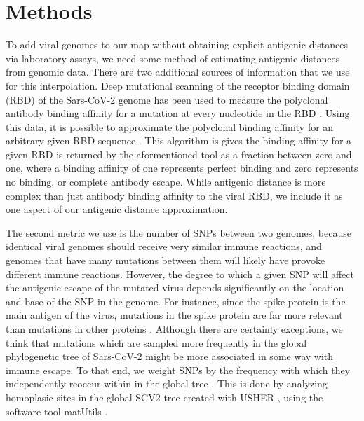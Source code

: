 \documentclass{article}
\begin{document}

\section{Methods}

To add viral genomes to our map without obtaining explicit antigenic distances via laboratory assays, we need some method of estimating antigenic distances from genomic data. 
There are two additional sources of information that we use for this interpolation.
Deep mutational scanning of the receptor binding domain (RBD) of the Sars-CoV-2 genome has been used to measure the polyclonal antibody binding affinity for a mutation at every nucleotide in the RBD \cite{starr2020deep}.
Using this data, it is possible to approximate the polyclonal binding affinity for an arbitrary given RBD sequence \cite{greaney2022antibody}.
This algorithm is gives the binding affinity for a given RBD is returned by the aformentioned tool as a fraction between zero and one, where a binding affinity of one represents perfect binding and zero represents no binding, or complete antibody escape.
While antigenic distance is more complex than just antibody binding affinity to the viral RBD, we include it as one aspect of our antigenic distance approximation. 

The second metric we use is the number of SNPs between two genomes, because identical viral genomes should receive very similar immune reactions, and genomes that have many mutations between them will likely have provoke different immune reactions.
However, the degree to which a given SNP will affect the antigenic escape of the mutated virus depends significantly on the location and base of the SNP in the genome. 
For instance, since the spike protein is the main antigen of the virus, mutations in the spike protein are far more relevant than mutations in other proteins \cite{harvey2021sars}.
Although there are certainly exceptions, we think that mutations which are sampled more frequently in the global phylogenetic tree of Sars-CoV-2 might be more associated in some way with immune escape.
To that end, we weight SNPs by the frequency with which they independently reoccur within in the global tree \cite{attwood2022phylogenetic}.
This is done by analyzing homoplasic sites in the global SCV2 tree created with USHER \cite{turakhia2021ultrafast}, using the software tool matUtils \cite{mcbroome2021matutils}.
\end{document}
